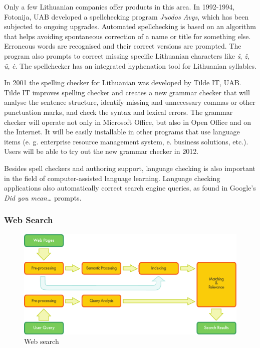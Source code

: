 \begin{multicols}{2}
Only a few Lithuanian companies offer products in this area. In 1992-1994, Fotonija, UAB developed a spellchecking program \textit{Juodos Avys}, which has been subjected to ongoing upgrades. Automated spellchecking is based on an algorithm that helps avoiding spontaneous correction of a name or title for something else. Erroneous words are recognised and their correct versions are prompted. The program also prompts to correct missing specific Lithuanian characters like \textit{š}, \textit{ž},  \textit{ū}, \textit{ė}. The spellchecker has an integrated hyphenation tool for Lithuanian syllables.

In 2001 the spelling checker for Lithuanian was developed by Tilde IT, UAB. Tilde IT improves spelling checker and creates a new grammar checker that will analyse the sentence structure, identify missing and unnecessary commas or other punctuation marks, and check the syntax and lexical errors. The grammar checker will operate not only in Microsoft Office, but also in Open Office and on the Internet. It will be easily installable in other programs that use language items (e. g. enterprise resource management system, e. business solutions, etc.). Users will be able to try out the new grammar checker in 2012.

Besides spell checkers and authoring support, language checking is also important in the field of computer-assisted language learning. Language checking applications also automatically correct search engine queries, as found in Google's \textit{Did you mean…} prompts.

\subsubsection{Web Search}

\begin{figure}[htb]
  \center
  \includegraphics[width=\textwidth]{../_media/english/web_search_architecture}
  \caption{Web search}
  \label{fig:websearcharch_en}
 \end{figure}


\end{multicols}
